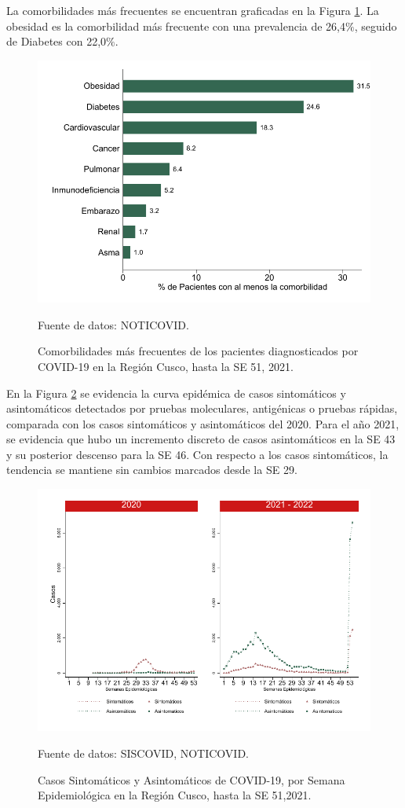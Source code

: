 \documentclass[12pt,a4paper,openany]{book}
\begin{document}
La comorbilidades más frecuentes se encuentran graficadas en la Figura \ref{fig:comorbilidades}. La obesidad es la comorbilidad más frecuente con una prevalencia de 26,4$\%$, seguido de Diabetes con 22,0$\%$. 
\begin{figure}[h]
	\caption{Comorbilidades más frecuentes de los pacientes diagnosticados por COVID-19 en la Región Cusco, hasta la SE 51, 2021. }\label{fig:comorbilidades}
	\begin{center}
		\includegraphics[width=0.65\linewidth]{../figuras/figura_comorbilidad.pdf}
	\end{center}
	{\footnotesize {Fuente de datos: NOTICOVID.}}
\end{figure}
\clearpage
 En la Figura \ref{fig:sintomaticos_asintomati} se evidencia la curva epidémica de casos sintomáticos y asintomáticos detectados por pruebas moleculares, antigénicas o pruebas rápidas, comparada con los casos sintomáticos y asintomáticos del 2020. Para el año 2021, se evidencia que hubo un incremento discreto de casos asintomáticos en la SE 43 y su posterior descenso para la SE 46. Con respecto a los casos sintomáticos, la tendencia se mantiene sin cambios marcados desde la SE 29. 
 
 
\begin{figure}[h]
	\caption{Casos Sintomáticos y Asintomáticos de COVID-19, por Semana Epidemiológica en la Región Cusco, hasta la SE 51,2021.  }\label{fig:sintomaticos_asintomati}
	
	\begin{center}
		\includegraphics[width=0.75\linewidth]{../figuras/sintomaticos_20_21.pdf}
	\end{center}
	{\footnotesize {Fuente de datos: SISCOVID, NOTICOVID.}}
\end{figure}
\clearpage
\end{document}
